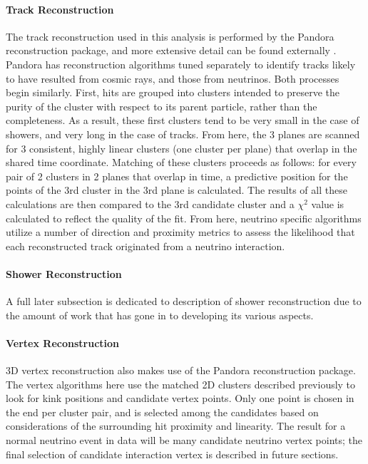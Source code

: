 \documentclass[12pt]{article}
\begin{document}
\paragraph{Track Reconstruction}
The track reconstruction used in this analysis is performed by the Pandora reconstruction package, and more extensive detail can be found externally \cite{bib:pandora}.  Pandora has reconstruction algorithms tuned separately to identify tracks likely to have resulted from cosmic rays, and those from neutrinos. Both processes begin similarly.  First, hits are grouped into clusters intended to preserve the purity of the cluster with respect to its parent particle, rather than the completeness.  As a result, these first clusters tend to be very small in the case of showers, and very long in the case of tracks.  From here, the 3 planes are scanned for 3 consistent, highly linear clusters (one cluster per plane) that overlap in the shared time coordinate.  Matching of these clusters proceeds as follows:  for every pair of 2 clusters in 2 planes that overlap in time, a predictive position for the points of the 3rd cluster in the 3rd plane is calculated. The results of all these calculations are then compared to the 3rd candidate cluster and a $\chi^2$ value is calculated to reflect the quality of the fit. From here, neutrino specific algorithms utilize a number of direction and proximity metrics to assess the likelihood that each reconstructed track originated from a neutrino interaction. 

\paragraph{Shower Reconstruction}
A full later subsection is dedicated to description of shower reconstruction due to the amount of work that has gone in to developing its various aspects.

\paragraph{Vertex Reconstruction}
3D vertex reconstruction also makes use of the Pandora reconstruction package. The vertex algorithms here use the matched 2D clusters described previously to look for kink positions and candidate vertex points. Only one point is chosen in the end per cluster pair, and is selected among the candidates based on considerations of the surrounding hit proximity and linearity. The result for a normal neutrino event in data will be many candidate neutrino vertex points; the final selection of candidate interaction vertex is described in future sections.
\end{document}
